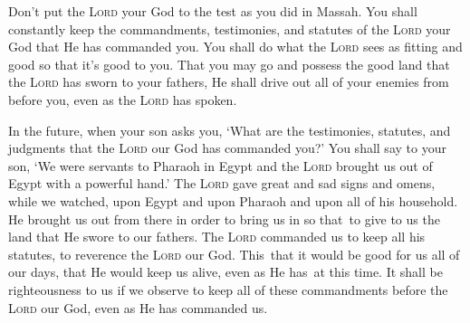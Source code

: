\begin{inparaenum}
     Don't put the \textsc{Lord} your God to the test as you did in Massah.%
     You shall constantly keep the commandments, testimonies, and statutes of the \textsc{Lord} your God that He has commanded you.%
     You shall do what the \textsc{Lord} sees as fitting and good so that it's good to you. That you may go and possess the good land that the \textsc{Lord} has sworn to your fathers,%
     He shall drive out all of your enemies from before you, even as the \textsc{Lord} has spoken.%
    
     In the future, when your son asks you, `What are the testimonies, statutes, and judgments that the \textsc{Lord} our God has commanded you?'%
     You shall say to your son, `We were servants to Pharaoh in Egypt and the \textsc{Lord} brought us out of Egypt with a powerful hand.'%
     The \textsc{Lord} gave great and sad signs and omens, while we watched, upon Egypt and upon Pharaoh and upon all of his household.%
     He brought us out from there in order to bring us in so that\understood\ to give to us the land that He swore to our fathers.%
     The \textsc{Lord} commanded us to keep all his statutes, to reverence the \textsc{Lord} our God. This\understood\ that it would be good for us all of our days, that He would keep us alive, even as He has\understood\ at this time.%
     It shall be righteousness to us if we observe to keep all of these commandments before the \textsc{Lord} our God, even as He has commanded us.%
\end{inparaenum}
